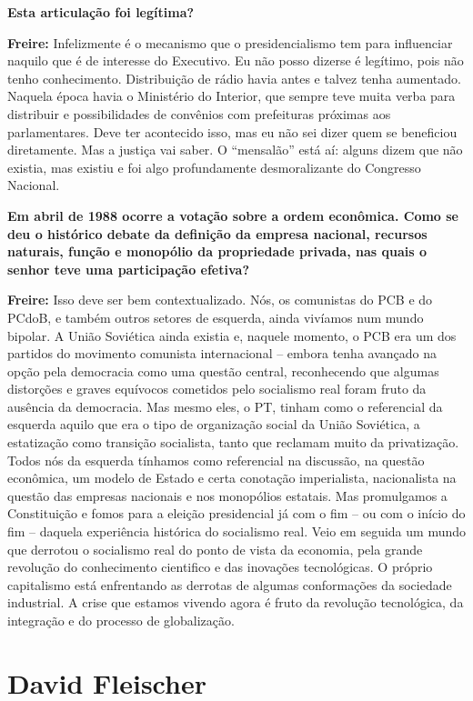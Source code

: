 \textbf{Esta articulação foi legítima?}

\textbf{Freire:} Infelizmente é o mecanismo que o presidencialismo tem
para influenciar naquilo que é de interesse do Executivo. Eu não posso
dizerse é legítimo, pois não tenho conhecimento. Distribuição de rádio
havia antes e talvez tenha aumentado. Naquela época havia o Ministério
do Interior, que sempre teve muita verba para distribuir e
possibilidades de convênios com prefeituras próximas aos parlamentares.
Deve ter acontecido isso, mas eu não sei dizer quem se beneficiou
diretamente. Mas a justiça vai saber. O ``mensalão'' está aí: alguns
dizem que não existia, mas existiu e foi algo profundamente
desmoralizante do Congresso Nacional.

\textbf{Em abril de 1988 ocorre a votação sobre a ordem econômica. Como
se deu o histórico debate da definição da empresa nacional, recursos
naturais, função e monopólio da propriedade privada, nas quais o senhor
teve uma participação efetiva?}

\textbf{Freire:} Isso deve ser bem contextualizado. Nós, os comunistas
do PCB e do PCdoB, e também outros setores de esquerda, ainda vivíamos
num mundo bipolar. A União Soviética ainda existia e, naquele momento, o
PCB era um dos partidos do movimento comunista internacional -- embora
tenha avançado na opção pela democracia como uma questão central,
reconhecendo que algumas distorções e graves equívocos cometidos pelo
socialismo real foram fruto da ausência da democracia. Mas mesmo eles, o
PT, tinham como o referencial da esquerda aquilo que era o tipo de
organização social da União Soviética, a estatização como transição
socialista, tanto que reclamam muito da privatização. Todos nós da
esquerda tínhamos como referencial na discussão, na questão econômica,
um modelo de Estado e certa conotação imperialista, nacionalista na
questão das empresas nacionais e nos monopólios estatais. Mas
promulgamos a Constituição e fomos para a eleição presidencial já com o
fim -- ou com o início do fim -- daquela experiência histórica do
socialismo real. Veio em seguida um mundo que derrotou o socialismo real
do ponto de vista da economia, pela grande revolução do conhecimento
cientifico e das inovações tecnológicas. O próprio capitalismo está
enfrentando as derrotas de algumas conformações da sociedade industrial.
A crise que estamos vivendo agora é fruto da revolução tecnológica, da
integração e do processo de globalização.

\section{David Fleischer}

